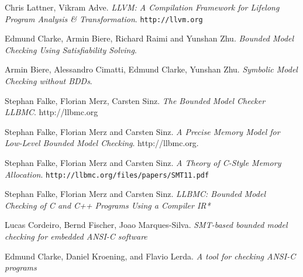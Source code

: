 \documentclass[14pt]{article}
\begin{document}
\begin{thebibliography}{9}

Chris Lattner, Vikram Adve.
\textit{LLVM: A Compilation Framework for Lifelong Program Analysis \& Transformation}.
\texttt{http://llvm.org}

Edmund Clarke, Armin Biere, Richard Raimi and Yunshan Zhu.
\textit{Bounded Model Checking Using Satisfiability Solving}.

Armin Biere, Alessandro Cimatti, Edmund Clarke, Yunshan Zhu.
\textit{Symbolic Model Checking without BDDs}. 

Stephan Falke, Florian Merz, Carsten Sinz.
\textit{The Bounded Model Checker LLBMC}. 
http://llbmc.org

Stephan Falke, Florian Merz and Carsten Sinz.
\textit{A Precise Memory Model for Low-Level Bounded Model Checking}.
http://llbmc.org.

Stephan Falke, Florian Merz and Carsten Sinz.
\textit{A Theory of C-Style Memory Allocation}.
\texttt{http://llbmc.org/files/papers/SMT11.pdf}

Stephan Falke, Florian Merz and Carsten Sinz.
\textit{LLBMC: Bounded Model Checking of C and C++ Programs Using a Compiler IR*}

Lucas Cordeiro, Bernd Fischer, Joao Marques-Silva.
\textit{SMT-based bounded model checking for embedded ANSI-C software}

Edmund Clarke, Daniel Kroening, and Flavio Lerda.
\textit{A tool for checking ANSI-C programs}

\end{thebibliography}
\end{document}
